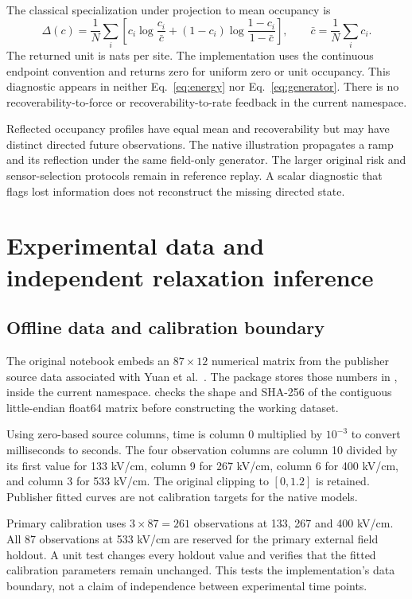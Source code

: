 \documentclass[11pt,a4paper]{article}
\newcommand{\code}[1]{\texttt{\detokenize{#1}}}
\newcommand{\repo}[1]{\path{#1}}
\begin{document}
The classical specialization under projection to mean occupancy is
\begin{equation}
 \Delta(c)=\frac1N\sum_i\left[c_i\log\frac{c_i}{\bar c}
 +(1-c_i)\log\frac{1-c_i}{1-\bar c}\right],\qquad \bar c=\frac1N\sum_i c_i.
 \label{eq:recoverability}
\end{equation}
The returned unit is nats per site. The implementation uses the continuous endpoint convention and returns zero for uniform zero or unit occupancy. This diagnostic appears in neither Eq.~\eqref{eq:energy} nor Eq.~\eqref{eq:generator}. There is no recoverability-to-force or recoverability-to-rate feedback in the current namespace.

Reflected occupancy profiles have equal mean and recoverability but may have distinct directed future observations. The native illustration propagates a ramp and its reflection under the same field-only generator. The larger original risk and sensor-selection protocols remain in reference replay. A scalar diagnostic that flags lost information does not reconstruct the missing directed state.

\section{Experimental data and independent relaxation inference}\label{sec:inference}

\subsection{Offline data and calibration boundary}

The original notebook embeds an $87\times12$ numerical matrix from the publisher source data associated with Yuan et al.~\cite{yuan}. The package stores those numbers in \repo{data/fig2h.json}, inside the current namespace. \code{PolarizationDataset.load} checks the shape and SHA-256 of the contiguous little-endian float64 matrix before constructing the working dataset.

Using zero-based source columns, time is column 0 multiplied by $10^{-3}$ to convert milliseconds to seconds. The four observation columns are column 10 divided by its first value for 133 kV/cm, column 9 for 267 kV/cm, column 6 for 400 kV/cm, and column 3 for 533 kV/cm. The original clipping to $[0,1.2]$ is retained. Publisher fitted curves are not calibration targets for the native models.

Primary calibration uses $3\times87=261$ observations at 133, 267 and 400 kV/cm. All 87 observations at 533 kV/cm are reserved for the primary external field holdout. A unit test changes every holdout value and verifies that the fitted calibration parameters remain unchanged. This tests the implementation's data boundary, not a claim of independence between experimental time points.
\end{document}
